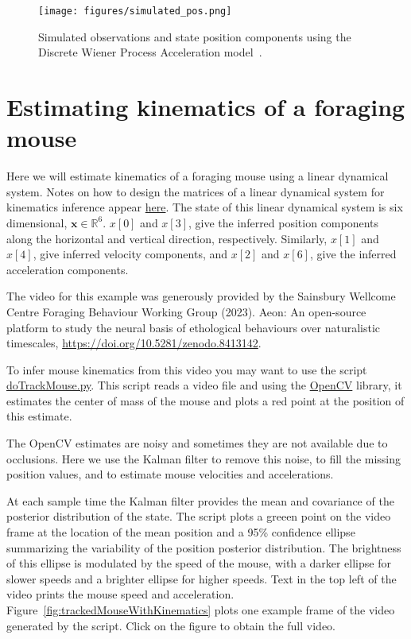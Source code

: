 \documentclass[12pt]{article}
\begin{document}
\begin{figure}[h]
	\begin{center}
		\texttt{[image: figures/simulated\_pos.png]}
		\label{fig:simulated_pos}
		\caption{Simulated observations and state position components
              using the Discrete Wiener Process Acceleration
              model~\citep[][Section 6.3.3]{barShalomEtAl04}.}
	\end{center}
\end{figure}

\section{Estimating kinematics of a foraging mouse}

Here we will estimate kinematics of a foraging mouse using a linear dynamical
system. Notes on how to design the matrices of a linear dynamical system for
kinematics inference appear
\href{https://github.com/joacorapela/lds_python/blob/master/docs/tracking/tracking.pdf}{here}.
The state of this linear dynamical system is six dimensional,
$\mathbf{x}\in\mathbb{R}^6$. $x[0]$ and $x[3]$, give the inferred
position components along the horizontal and vertical direction, respectively.
Similarly, $x[1]$ and $x[4]$, give inferred velocity components, and $x[2]$ and
$x[6]$, give the inferred acceleration components.

The video for this example was generously provided by the
Sainsbury Wellcome Centre Foraging Behaviour Working Group (2023). Aeon: An
open-source platform to study the neural basis of ethological behaviours over
naturalistic timescales, \url{https://doi.org/10.5281/zenodo.8413142}.

To infer mouse kinematics from this video you may want to use the script
\href{https://github.com/joacorapela/neuroinformatics24/blob/master/worksheets/07_linearDynamicalSystems/code/scripts/doTrackMouse.py}{doTrackMouse.py}.
This script reads a video file and using the \href{https://opencv.org/}{OpenCV}
library, it estimates the center of mass
of the mouse and plots a red point at the position of this estimate.

The OpenCV estimates are noisy and sometimes they are not available due to occlusions.
Here we use the Kalman filter to remove this noise, to fill the
missing position values, and to estimate mouse velocities and accelerations.

At each sample time the Kalman filter provides the mean and covariance of the
posterior distribution of the state. The script plots a greeen point on the
video frame at the location of the mean position and a 95\% confidence ellipse
summarizing the variability of the position posterior distribution. The
brightness of this ellipse is modulated by the speed of the mouse, with a
darker ellipse for slower speeds and a brighter ellipse for higher speeds. Text
in the top left of the video prints the mouse speed and acceleration.
Figure~\ref{fig:trackedMouseWithKinematics} plots one example frame of the
video generated by the script. Click on the figure to obtain the full video.
\end{document}

